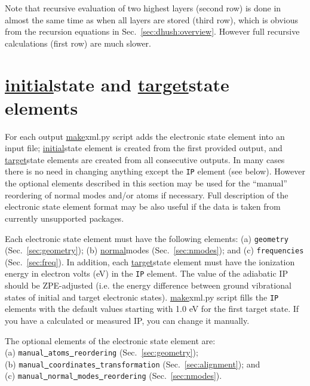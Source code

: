 \documentclass[11pt]{article}
\begin{document}
Note that recursive evaluation of two highest layers (second row) is done in almost the same time 
as when all layers are stored (third row), 
which is obvious from the recursion equations in Sec.~\ref{sec:dhush:overview}.
However full recursive calculations (first row) are much slower.


\section{\ul{initial}{state} and \ul{target}{state} elements}
\label{sec:elstates}

For each \ai output \ul{make}{xml.py} script adds the electronic state element 
into an input  \xml file; \ul{initial}{state} element is created from the first provided output, 
and \ul{target}{state} elements are created from all consecutive outputs.
In many cases there is no need in changing anything except the {\tt IP} element (see below).
However the optional elements described in this section may be used for 
the ``manual'' reordering of normal modes and/or atoms if necessary.
Full description of the electronic state element format may be also useful 
if the data is taken from currently unsupported \ai packages.

Each electronic state element must have the following elements: 
(a) {\tt geometry} (Sec.~\ref{sec:geometry});
(b) \ul{normal}{modes} (Sec.~\ref{sec:nmodes});
and (c) {\tt frequencies} (Sec.~\ref{sec:freq}). 
In addition, each \ul{target}{state} element must have the ionization energy in electron volts (eV) in the {\tt IP} element. 
The value of the adiabatic IP should be ZPE-adjusted (i.e. the energy difference between ground vibrational states of 
initial and target electronic states). \ul{make}{xml.py} script fills the {\tt IP} elements with the default values
starting with 1.0 eV for the first target state. If you have a calculated or measured IP, you can change it manually.

The optional elements of the electronic state element are:\\
(a) {\tt manual\underline{~}atoms\underline{~}reordering} (Sec.~\ref{sec:geometry});\\
(b) {\tt manual\underline{~}coordinates\underline{~}transformation} (Sec.~\ref{sec:alignment}); and\\
(c) {\tt manual\underline{~}normal\underline{~}modes\underline{~}reordering} (Sec.~\ref{sec:nmodes}).

\end{document}
